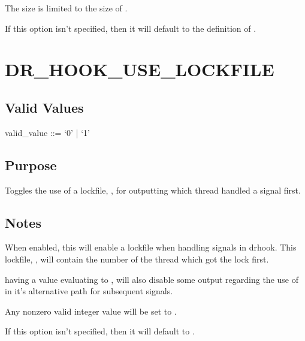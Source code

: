 \documentclass[letterpaper,10pt,english]{sphinxmanual}
\begin{document}
\sphinxAtStartPar
The size is limited to the size of .

\sphinxAtStartPar
If this option isn’t specified, then it will default to the definition of .


\section{DR\_HOOK\_USE\_LOCKFILE}
\label{\detokenize{flag/flag:dr-hook-use-lockfile}}\label{\detokenize{flag/flag:id151}}

\subsection{Valid Values}
\label{\detokenize{flag/flag:id152}}
\begin{DUlineblock}{0em}
\item[] valid\_value ::= ‘0’ | ‘1’
\end{DUlineblock}


\subsection{Purpose}
\label{\detokenize{flag/flag:id153}}
\sphinxAtStartPar
Toggles the use of a lockfile, , for outputting which thread handled a signal first.


\subsection{Notes}
\label{\detokenize{flag/flag:id154}}
\sphinxAtStartPar
When enabled, this will enable a lockfile when handling signals in drhook. This lockfile, , will contain the number of the thread which got the lock first.

\sphinxAtStartPar
{} having a value evaluating to , will also disable some output regarding the use of {\hyperref[\detokenize{flag/flag:dr-hook-use-lockfile}]{}} in it’s alternative path for subsequent signals.

\sphinxAtStartPar
Any non\sphinxhyphen{}zero valid integer value will be set to .

\sphinxAtStartPar
If this option isn’t specified, then it will default to .
\end{document}

